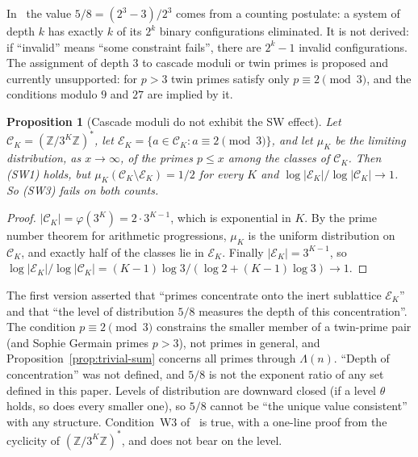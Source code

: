 \documentclass[12pt]{amsart}
\theoremstyle{plain}
\newtheorem{proposition}[theorem]{Proposition}
\theoremstyle{definition}
\theoremstyle{remark}
\newcommand{\Z}{\mathbb{Z}}
\begin{document}
In~\cite{WakilCF,WakilRamanujan} the value $5/8 = (2^3 - 3)/2^3$ comes from a
counting postulate: a system of depth $k$ has exactly $k$ of its $2^k$ binary
configurations eliminated. It is not derived: if ``invalid'' means ``some
constraint fails'', there are $2^k - 1$ invalid configurations. The assignment of
depth $3$ to cascade moduli or twin primes is proposed and currently unsupported:
for $p > 3$ twin primes satisfy only $p \equiv 2 \pmod{3}$, and the conditions
modulo $9$ and $27$ are implied by it.

\begin{proposition}[Cascade moduli do not exhibit the SW effect]
\label{prop:cascade-sw}
Let $\mathcal{C}_K = (\Z/3^K\Z)^*$, let
$\mathcal{E}_K = \{a \in \mathcal{C}_K : a \equiv 2 \pmod{3}\}$, and let
$\mu_K$ be the limiting distribution, as $x \to \infty$, of the primes
$p \leq x$ among the classes of $\mathcal{C}_K$. Then (SW1) holds, but
$\mu_K(\mathcal{C}_K \setminus \mathcal{E}_K) = 1/2$ for every $K$ and
$\log|\mathcal{E}_K|/\log|\mathcal{C}_K| \to 1$. So (SW3) fails on both counts.
\end{proposition}

\begin{proof}
$|\mathcal{C}_K| = \varphi(3^K) = 2 \cdot 3^{K-1}$, which is exponential in $K$.
By the prime number theorem for arithmetic progressions, $\mu_K$ is the uniform
distribution on $\mathcal{C}_K$, and exactly half of the classes lie in
$\mathcal{E}_K$. Finally $|\mathcal{E}_K| = 3^{K-1}$, so
$\log|\mathcal{E}_K|/\log|\mathcal{C}_K| = (K-1)\log 3/(\log 2 + (K-1)\log 3) \to 1$.
\end{proof}

The first version asserted that ``primes concentrate onto the inert sublattice
$\mathcal{E}_K$'' and that ``the level of distribution $5/8$ measures the depth
of this concentration''. The condition $p \equiv 2 \pmod{3}$ constrains the
smaller member of a twin-prime pair (and Sophie Germain primes $p > 3$), not
primes in general, and Proposition~\ref{prop:trivial-sum} concerns all primes through
$\Lambda(n)$. ``Depth of concentration'' was not defined, and $5/8$ is not the
exponent ratio of any set defined in this paper. Levels of distribution are
downward closed (if a level $\theta$ holds, so does every smaller one), so $5/8$
cannot be ``the unique value consistent'' with any structure. Condition~W3
of~\cite{WakilW3} is true, with a one-line proof from the cyclicity of
$(\Z/3^K\Z)^*$, and does not bear on the level.

\end{document}

